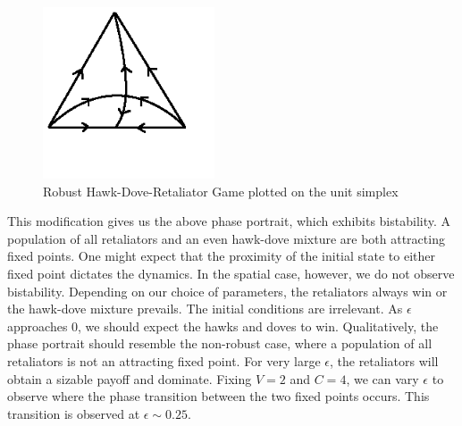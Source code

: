 \documentclass[12pt]{amsart}
\begin{document}
\begin{figure}[h]
\caption{Robust Hawk-Dove-Retaliator Game plotted on the unit simplex}
\centering
\includegraphics[width = 2in]{Diagrams/HDR/phase}
\end{figure}

This modification gives us the above phase portrait, which exhibits bistability. A population of all retaliators and an even hawk-dove mixture are both attracting fixed points. One might expect that the proximity of the initial state to either fixed point dictates the dynamics. In the spatial case, however, we do not observe bistability. Depending on our choice of parameters, the retaliators always win or the hawk-dove mixture prevails. The initial conditions are irrelevant. As $\epsilon$ approaches 0, we should expect the hawks and doves to win. Qualitatively, the phase portrait should resemble the non-robust case, where a population of all retaliators is not an attracting fixed point. For very large $\epsilon$, the retaliators will obtain a sizable payoff and dominate. Fixing $V = 2$ and $C = 4$, we can vary $\epsilon$ to observe where the phase transition between the two fixed points occurs. This transition is observed at $\epsilon \sim 0.25$. 
\end{document}
